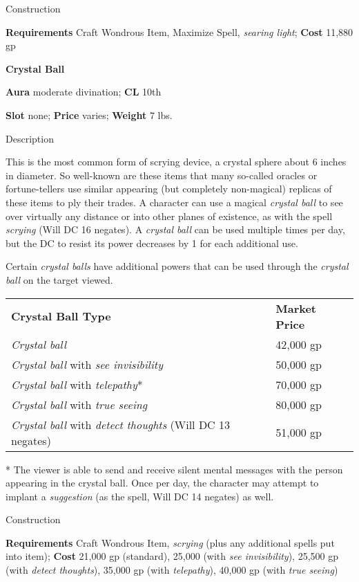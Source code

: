 Construction
				
\textbf{Requirements }Craft Wondrous Item, Maximize Spell, \textit{searing light}; \textbf{Cost} 11,880 gp
				
\textbf{Crystal Ball}
				
\textbf{Aura} moderate divination;\textbf{ CL }10th
				
\textbf{Slot} none; \textbf{Price} varies; \textbf{Weight} 7 lbs.
				
Description
				
This is the most common form of scrying device, a crystal sphere about 6 inches in diameter. So well-known are these items that many so-called oracles or fortune-tellers use similar appearing (but completely non-magical) replicas of these items to ply their trades. A character can use a magical \textit{crystal ball} to see over virtually any distance or into other planes of existence, as with the spell \textit{scrying }(Will DC 16 negates). A \textit{crystal ball} can be used multiple times per day, but the DC to resist its power decreases by 1 for each additional use.
				
Certain \textit{crystal balls }have additional powers that can be used through the \textit{crystal ball }on the target viewed.
\begin{tabularx}{\linewidth}{Xl}
\textbf{Crystal Ball Type} & \textbf{Market Price}\\
\textit{Crystal ball} & 42,000 gp\\
\textit{Crystal ball} with \textit{see invisibility} & 50,000 gp\\
\textit{Crystal ball} with \textit{telepathy}* & 70,000 gp\\
\textit{Crystal ball} with \textit{true seeing} & 80,000 gp\\
\textit{Crystal ball} with \textit{detect thoughts} (Will DC 13 negates) & 51,000 gp\\
\end{tabularx}
* The viewer is able to send and receive silent mental messages with the person appearing in the crystal ball. Once per day, the character may attempt to implant a \textit{suggestion} (as the spell, Will DC 14 negates) as well.

Construction
				
\textbf{Requirements} Craft Wondrous Item, \textit{scrying} (plus any additional spells put into item); \textbf{Cost }21,000 gp (standard), 25,000 (with \textit{see invisibility}), 25,500 gp (with \textit{detect thoughts}), 35,000 gp (with \textit{telepathy}), 40,000 gp (with \textit{true seeing})
				
